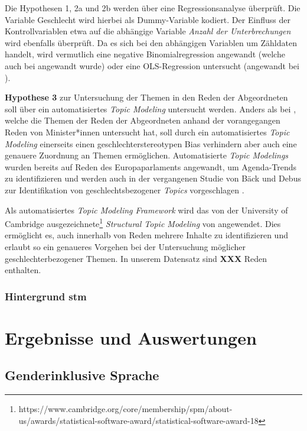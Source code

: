 \documentclass[12pt, 
    twoside=false, 
    bibliography=totoc, 
    numbers=endperiod, 
    headings=normal, 
    toc=chapterentrydotfill
    ]{scrbook}
\begin{document}
Die {Hypothesen 1, 2a und 2b} werden über eine Regressionsanalyse überprüft. Die Variable Geschlecht wird hierbei als Dummy-Variable kodiert. Der Einfluss der Kontrollvariablen etwa auf die abhängige Variable \emph{Anzahl der Unterbrechungen} wird ebenfalls überprüft. Da es sich bei den abhängigen Variablen um Zähldaten handelt, wird vermutlich eine negative Binomialregression angewandt (welche auch bei \textcite{back_2014} angewandt wurde) oder eine OLS-Regression untersucht (angewandt bei \textcite{coffe_2013}).


\textbf{Hypothese 3} zur Untersuchung der Themen in den Reden der Abgeordneten soll über ein automatisiertes \emph{Topic Modeling} untersucht werden. Anders als bei \textcite{back_2014}, welche die Themen der Reden der Abgeordneten anhand der vorangegangen Reden von Minister*innen untersucht hat, soll durch ein automatisiertes \emph{Topic Modeling} einerseits einen geschlechterstereotypen Bias verhindern aber auch eine genauere Zuordnung an Themen ermöglichen. 
Automatisierte \emph{Topic Modelings} wurden bereits auf Reden des Europaparlaments angewandt, um Agenda-Trends zu identifizieren \parencite[vgl.][]{greene_2016} und werden auch in der vergangenen Studie von Bäck und Debus zur Identifikation von geschlechtsbezogener \emph{Topics} vorgeschlagen \parencite*[18]{back_2018}.

Als automatisiertes \emph{Topic Modeling Framework} wird das von der University of Cambridge ausgezeichnete\footnote{https://www.cambridge.org/core/membership/spm/about-us/awards/statistical-software-award/statistical-software-award-18} \emph{Structural Topic Modeling} von \textcite{roberts_2018} angewendet. Dies ermöglicht es, auch innerhalb von Reden mehrere Inhalte zu identifizieren und erlaubt so ein genaueres Vorgehen bei der Untersuchung möglicher geschlechterbezogener Themen. In unserem Datensatz sind \textbf{XXX} Reden enthalten.

\subsection{Hintergrund stm}

\chapter{Ergebnisse und Auswertungen}

\section{Genderinklusive Sprache}
\end{document}
